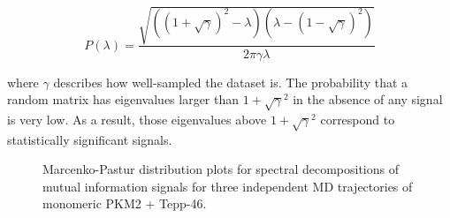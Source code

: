 \documentclass[11pt]{article}
\begin{document}
\begin{equation} 
P(\lambda) = \frac{\sqrt{((1 + \sqrt{\gamma})^2 - \lambda)(\lambda - (1 - \sqrt{\gamma})^2)}}{2 \pi \gamma \lambda}
\end{equation}

where $\gamma$ describes how well-sampled the dataset is. The probability that a random matrix has eigenvalues larger than $1 + \sqrt{\gamma}^2$ in the absence of any signal is very low. As a result, those eigenvalues above $1 + \sqrt{\gamma}^2$ correspond to statistically significant signals.
\begin{figure}
\begin{minipage}{.5\linewidth}
\centering
{}
\end{minipage}%
\begin{minipage}{.5\linewidth}
\centering
{}
\end{minipage}\par\medskip
\centering
{}

\caption{Marcenko-Pastur distribution plots for spectral decompositions of mutual information signals for three independent MD trajectories of monomeric PKM2 + Tepp-46.}
\label{fig:main}
\end{figure}
\end{document}

